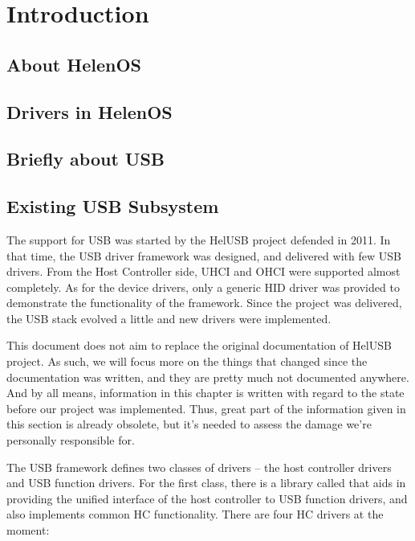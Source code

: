\chapter{Introduction}

\section{About HelenOS}

\section{Drivers in HelenOS}

\section{Briefly about USB}


\section{Existing USB Subsystem}

The support for USB was started by the HelUSB project defended in 2011. In that
time, the USB driver framework was designed, and delivered with few USB
drivers. From the Host Controller side, UHCI and OHCI were supported almost
completely. As for the device drivers, only a generic HID driver was provided
to demonstrate the functionality of the framework. Since the project was
delivered, the USB stack evolved a little and new drivers were implemented.

This document does not aim to replace the original documentation of HelUSB
project. As such, we will focus more on the things that changed since the
documentation was written, and they are pretty much not documented anywhere.
And by all means, information in this chapter is written with regard to the
state before our project was implemented. Thus, great part of the information
given in this section is already obsolete, but it's needed to assess the damage
we're personally responsible for.

The USB framework defines two classes of drivers -- the host controller drivers
and USB function drivers. For the first class, there is a library called
 that aids in providing the unified interface of the host
controller to USB function drivers, and also implements common HC
functionality. There are four HC drivers at the moment:

